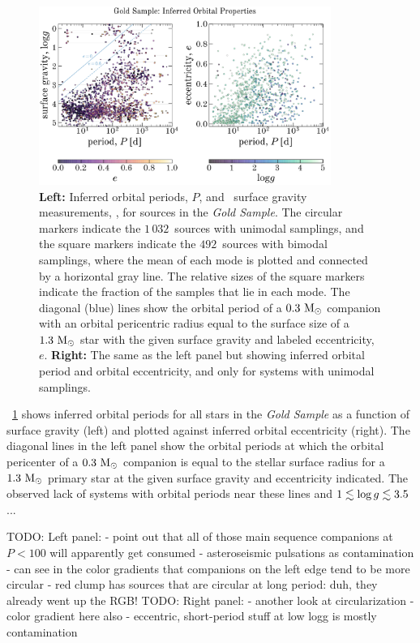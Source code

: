 \documentclass[modern]{aastex63}
\newcommand{\ngold}{\ensuremath{1\,032}}
\newcommand{\nbimodal}{\ensuremath{492}}
\begin{document}
\begin{figure}[!t]
    \begin{center}
    \includegraphics[width=0.85\textwidth]{Plogg_Pe.pdf}
    \end{center}
    \caption{%
    \textbf{Left:} Inferred orbital periods, $P$, and \apogee\ surface gravity
    measurements, \logg, for sources in the \textit{Gold Sample}.
    The circular markers indicate the \ngold\ sources with unimodal samplings,
    and the square markers indicate the \nbimodal\ sources with bimodal
    samplings, where the mean of each mode is plotted and connected by a
    horizontal gray line.
    The relative sizes of the square markers indicate the fraction of the
    samples that lie in each mode.
    The diagonal (blue) lines show the orbital period of a $0.3~\mathrm{M}_\odot$ companion
    with an orbital pericentric radius equal to the surface size of a
    $1.3~\mathrm{M}_\odot$ star with the given surface gravity and labeled eccentricity,
    $e$.
    \textbf{Right:} The same as the left panel but showing inferred orbital
    period and orbital eccentricity, and only for systems with unimodal
    samplings.
    \label{fig:Plogg}
    }
\end{figure}

\figurename~\ref{fig:Plogg} shows inferred orbital periods for all stars in the
\textit{Gold Sample} as a function of surface gravity (left) and plotted against
inferred orbital eccentricity (right).
The diagonal lines in the left panel show the orbital periods at which the
orbital pericenter of a $0.3~\mathrm{M}_\odot$ companion is equal to the stellar surface
radius for a $1.3~\mathrm{M}_\odot$ primary star at the given surface gravity and
eccentricity indicated.
The observed lack of systems with orbital periods near these lines and $1
\lesssim \log g \lesssim 3.5$ ...

TODO: Left panel:
- point out that all of those main sequence companions at $P < 100$ will apparently get consumed
- asteroseismic pulsations as contamination
- can see in the color gradients that companions on the left edge tend to be more circular
- red clump has sources that are circular at long period: duh, they already went up the RGB!
TODO: Right panel:
- another look at circularization
- color gradient here also
- eccentric, short-period stuff at low logg is mostly contamination
\end{document}
